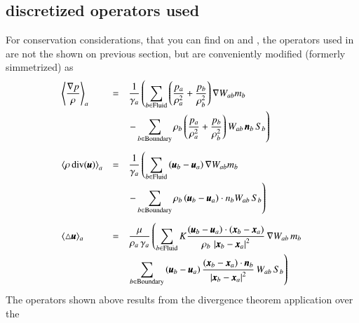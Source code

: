 \subsection{\NAME discretized operators used}
\label{ss:intro:aquagpusph:operators}
%
For conservation considerations, that you can find on \citep{mon2005} and
\citep{Colagrossi2009}, the operators used in \NAME are not the shown on previous
section, but are conveniently modified (formerly simmetrized) as
%
\begin{eqnarray}
\label{eq:aquagpusph:operators}
\begin{array}{lcl}
\dsty{\left\langle \frac{\gradient p}{\rho} \right\rangle_a} & = & 
\dsty{\frac{1}{\gamma_a}} \left(\dsty{
	\sum\limits_{b \in \mathrm{Fluid}}
		\left(\frac{p_a}{\rho_a^2} + \frac{p_b}{\rho_b^2}\right)
	\gradient W_{ab} m_b}\right.
	\vspace{0.1cm} \\ & & \left.\dsty{
	- \sum\limits_{b \in \mathrm{Boundary}}
		\rho_b \left(\frac{p_a}{\rho_a^2} + \frac{p_b}{\rho_b^2}\right)
	 W_{ab} \, \bs{n}_b \, S_b}\right)
\vspace{0.3cm} \\

\dsty{\left\langle \rho \, \divergence(\bs{u}) \right\rangle_a} & = & 
\dsty{\frac{1}{\gamma_a}} \left(\dsty{
	\sum\limits_{b \in \mathrm{Fluid}}
		\left(\bs{u}_b - \bs{u}_a\right)
	\gradient W_{ab} m_b}\right.
	\vspace{0.1cm} \\ & & \left.\dsty{
	- \sum\limits_{b \in \mathrm{Boundary}}
		\rho_b \left(\bs{u}_b - \bs{u}_a\right) \cdot n_b
	 W_{ab} \, S_b}\right)
\vspace{0.3cm} \\

\langle \laplacian \bs u \rangle_a & = & 
\dsty{\frac{\mu}{\rho_a \, \gamma_a}} \left(\dsty{
    \sum\limits_{b \in \mathrm{Fluid}}
	K \frac{
		\left(\bs{u}_b - \bs{u}_a \right) \cdot (\bs{x}_b - \bs{x}_a)
	}{
		 \rho_b \, \left\vert \bs{x}_b - \bs{x}_a \right\vert^2
	} \, \gradient  W_{ab} \, m_b }\right.
    \vspace{0.1cm} \\ & & \left.\dsty{
    \sum\limits_{b \in \mathrm{Boundary}}
	\left(\bs{u}_b - \bs{u}_a \right)
	\frac{
		 (\bs{x}_b - \bs{x}_a) \cdot \bs{n}_b
	}{
		 \left\vert \bs{x}_b - \bs{x}_a \right\vert^2
	} \, W_{ab} \, S_b}\right)
\end{array}
\end{eqnarray}
%
The operators shown above results from the divergence theorem application over the
